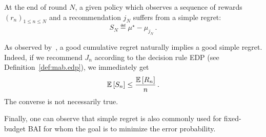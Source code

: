 \begin{definition}\label{def:mab.simple_regret}
\begin{leftbar}[defnbar]
	At the end of round $N$, a given policy which observes a sequence of rewards $(r_n)_{1 \leq n \leq N}$ and a recommendation $j_N$ suffers from a simple regret:
	\[
		S_N \eqdef \mu^{\star} - \mu_{j_N}\,.
	\]
\end{leftbar}
\end{definition}

\begin{remark}\label{remark:mab.simple}
\begin{leftbar}[remarkbar]
As observed by~\cite{bubeck2009pure}, a good cumulative regret naturally implies a good simple regret. Indeed, if we recommend $J_n$ according to the decision rule EDP (see Definition~\ref{def:mab.edp}), we immediately get 
\[
    \mathbb{E}\left[S_n\right] \leq \frac{\mathbb{E}\left[R_n\right]}{n}\,.
\]
The converse is not necessarily true.
\end{leftbar}
\end{remark}

Finally, one can observe that simple regret is also commonly used for fixed-budget BAI for whom the goal is to minimize the error probability.
